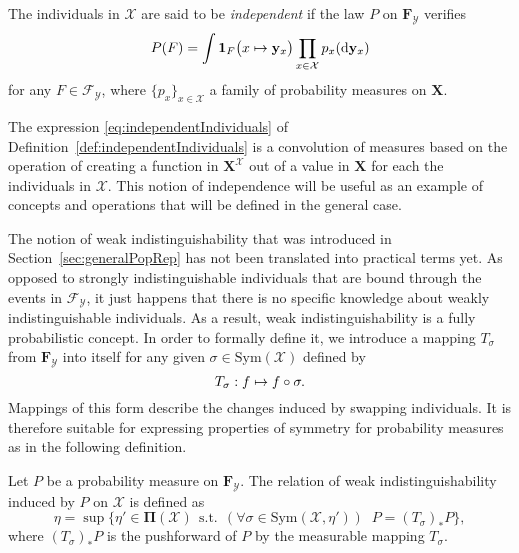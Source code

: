 \documentclass{aptpub}
\numberwithin{equation}{section}
\begin{document}
\begin{definition}
\label{def:independentIndividuals}
The individuals in ${\mathcal{X}}$ are said to be \emph{independent} if the law $P$ on ${\mathbf{F}}_{\mathcal{Y}}$ verifies
{\begin{equation}\label{{eq:independentIndividuals}}{
P(F) = \int {{\mathbf{1}}_{{F}}}\big(x \mapsto {\mathbf{y}}_x \big) \prod_{x \in {\mathcal{X}}} p_x({\mathrm{d}} {\mathbf{y}}_x)
}\end{equation}}
for any $F \in {\mathcal{F}}_{\mathcal{Y}}$, where $\{ p_x \}_{x \in {\mathcal{X}}}$ a family of probability measures on ${\mathbf{X}}$.
\end{definition}

The expression \eqref{eq:independentIndividuals} of Definition~\ref{def:independentIndividuals} is a convolution of measures based on the operation of creating a function in ${\mathbf{X}}^{\mathcal{X}}$ out of a value in ${\mathbf{X}}$ for each the individuals in ${\mathcal{X}}$. This notion of independence will be useful as an example of concepts and operations that will be defined in the general case.

The notion of weak indistinguishability that was introduced in Section~\ref{sec:generalPopRep} has not been translated into practical terms yet. As opposed to strongly indistinguishable individuals that are bound through the events in ${\mathcal{F}}_{\mathcal{Y}}$, it just happens that there is no specific knowledge about weakly indistinguishable individuals. As a result, weak indistinguishability is a fully probabilistic concept. In order to formally define it, we introduce a mapping $T_{\sigma}$ from ${\mathbf{F}}_{\mathcal{Y}}$ into itself for any given $\sigma \in {\mathrm{Sym}}({\mathcal{X}})$ defined by
{\begin{equation}\label{{eq:mappingWeakIndist}}{
T_{\sigma}: f \mapsto f \circ \sigma.
}\end{equation}}
Mappings of this form describe the changes induced by swapping individuals. It is therefore suitable for expressing properties of symmetry for probability measures as in the following definition.

\begin{definition}
\label{def:weakIndist}
Let $P$ be a probability measure on ${\mathbf{F}}_{\mathcal{Y}}$. The relation of weak indistinguishability induced by $P$ on ${\mathcal{X}}$ is defined as
{\begin{equation*}{
\eta = \sup \big\{\eta' \in {\boldsymbol{\Pi}}({\mathcal{X}}) {\;\,\mbox{s.t.}\;\,} {({\forall \sigma \in {\mathrm{Sym}}({\mathcal{X}},\eta')})\;\;} P = (T_{\sigma})_*P \big\},
}\end{equation*}}
where $(T_{\sigma})_*P$ is the pushforward of $P$ by the measurable mapping $T_{\sigma}$.
\end{definition}
\end{document}
